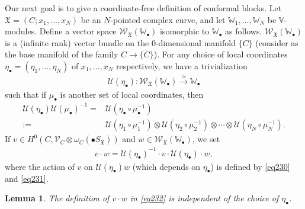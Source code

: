 \documentclass[12pt,a4paper,notitlepage]{report}
\theoremstyle{definition}
\theoremstyle{plain}
\newtheorem{lm}[df]{Lemma}
\newcommand{\fk}{\mathfrak}
\newcommand{\mc}{\mathcal}
\newcommand{\scr}{\mathscr}
\newcommand{\blt}{\bullet}
\newcommand{\Vbb}{\mathbb V}
\newcommand{\Wbb}{\mathbb W}
\numberwithin{equation}{section}
\begin{document}
Our next goal is to give a coordinate-free definition of conformal blocks. Let $\fk X=(C;x_1,\dots,x_N)$ be an $N$-pointed complex curve, and let $\Wbb_1,\dots,\Wbb_N$ be $\Vbb$-modules. Define a vector space $\scr W_{\fk X}(\Wbb_\blt)$ isomorphic to $\Wbb_\blt$ as follows. $\scr W_{\fk X}(\Wbb_\blt)$ is a (infinite rank) vector bundle on the $0$-dimensional manifold $\{C\}$ (consider as the base manifold of the family $C\rightarrow \{C\}$). For any choice of local coordinates $\eta_\blt=(\eta_1,\dots,\eta_N)$ of $x_1,\dots,x_N$ respectively, we have a trivialization \index{U@$\mc U(\rho),\mc U(\eta_\blt)$}
\begin{align}
\mc U(\eta_\blt):\scr W_{\fk X}(\Wbb_\blt)\xrightarrow{\simeq} \Wbb_\blt  \label{eq121}
\end{align}
such that if $\mu_\blt$ is another set of local coordinates, then
\begin{align}
\mc U(\eta_\blt)\mc U(\mu_\blt)^{-1}=&\mc U(\eta_\blt\circ\mu_\blt^{-1})\nonumber\\
:=&\mc U(\eta_1\circ\mu_1^{-1})\otimes \mc U(\eta_2\circ\mu_2^{-1})\otimes\cdots\otimes \mc U(\eta_N\circ\mu_N^{-1}).\label{eq123}
\end{align}
If $v\in H^0(C,\scr V_C\otimes\omega_C(\blt S_{\fk X}))$ and $w\in\scr W_{\fk X}(\Wbb_\blt)$, we set
\begin{align}
v\cdot w=\mc U(\eta_\blt)^{-1}\cdot v\cdot\mc U(\eta_\blt)\cdot w,\label{eq232}
\end{align}
where the action of $v$ on $\mc U(\eta_\blt)w$ (which depends on $\eta_\blt$) is defined by \eqref{eq230} and \eqref{eq231}.


\begin{lm}\label{lb125}
The definition of $v\cdot w$ in \eqref{eq232} is independent of the choice of $\eta_\blt$.
\end{lm}
 
\end{document}
